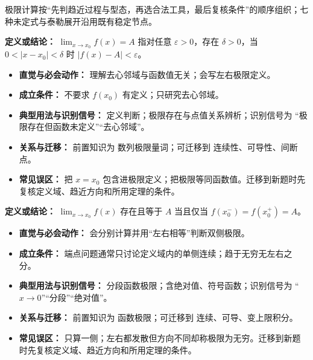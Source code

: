 \begin{knowledgeBox}
极限计算按“先判趋近过程与型态，再选合法工具，最后复核条件”的顺序组织；七种未定式与泰勒展开沿用既有稳定节点。
\end{knowledgeBox}

\begin{knowledgeBox}
\textbf{定义或结论：} $\lim_{x\to x_0}f(x)=A$ 指对任意 $\varepsilon>0$，存在 $\delta>0$，当 $0<|x-x_0|<\delta$ 时 $|f(x)-A|<\varepsilon$。

\begin{itemize}
  \item \textbf{直觉与必会动作：} 理解去心邻域与函数值无关；会写左右极限定义。
  \item \textbf{成立条件：} 不要求 $f(x_0)$ 有定义；只研究去心邻域。
  \item \textbf{典型用法与识别信号：} 定义判断；极限存在与点值关系辨析；识别信号为 “极限存在但函数未定义”“去心邻域”。
  \item \textbf{关系与迁移：} 前置知识为 数列极限量词；可迁移到 连续性、可导性、间断点。
  \item \textbf{常见误区：} 把 $x=x_0$ 包含进极限定义；把极限等同函数值。迁移到新题时先复核定义域、趋近方向和所用定理的条件。
\end{itemize}
\end{knowledgeBox}

\begin{knowledgeBox}
\textbf{定义或结论：} $\lim_{x\to x_0}f(x)$ 存在且等于 $A$ 当且仅当 $f(x_0^-)=f(x_0^+)=A$。

\begin{itemize}
  \item \textbf{直觉与必会动作：} 会分别计算并用“左右相等”判断双侧极限。
  \item \textbf{成立条件：} 端点问题通常只讨论定义域内的单侧连续；趋于无穷无左右之分。
  \item \textbf{典型用法与识别信号：} 分段函数极限；含绝对值、符号函数；识别信号为 “$x\to0$”“分段”“绝对值”。
  \item \textbf{关系与迁移：} 前置知识为 函数极限；可迁移到 连续、可导、变上限积分。
  \item \textbf{常见误区：} 只算一侧；左右都发散但方向不同却称极限为无穷。迁移到新题时先复核定义域、趋近方向和所用定理的条件。
\end{itemize}
\end{knowledgeBox}


